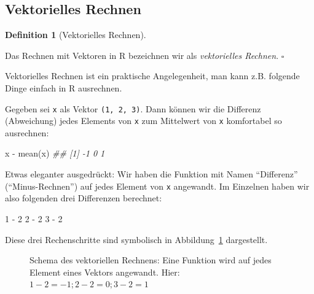 \documentclass[
  letterpaper,
  twoside,
  open=any]{scrbook}
\newenvironment{Shaded}{\begin{snugshade}}{\end{snugshade}}
\newcommand{\DecValTok}[1]{\textcolor[rgb]{0.68,0.00,0.00}{#1}}
\newcommand{\DocumentationTok}[1]{\textcolor[rgb]{0.37,0.37,0.37}{\textit{#1}}}
\newcommand{\FunctionTok}[1]{\textcolor[rgb]{0.28,0.35,0.67}{#1}}
\newcommand{\NormalTok}[1]{\textcolor[rgb]{0.00,0.23,0.31}{#1}}
\newcommand{\SpecialCharTok}[1]{\textcolor[rgb]{0.37,0.37,0.37}{#1}}
\theoremstyle{definition}
\newtheorem{definition}{Definition}[chapter]
\theoremstyle{definition}
\theoremstyle{definition}
\theoremstyle{remark}
\begin{document}
\subsection{Vektorielles Rechnen}\label{sec-veccalc}

\begin{definition}[Vektorielles
Rechnen]\protect\hypertarget{def-veccalc}{}\label{def-veccalc}

Das Rechnen mit Vektoren in R bezeichnen wir als \emph{vektorielles
Rechnen}. \(\square\)

\end{definition}

Vektorielles Rechnen ist ein praktische Angelegenheit, man kann z.B.
folgende Dinge einfach in R ausrechnen.

Gegeben sei \texttt{x} als Vektor \texttt{(1,\ 2,\ 3)}. Dann können wir
die Differenz (Abweichung) jedes Elements von \texttt{x} zum Mittelwert
von \texttt{x} komfortabel so ausrechnen:

\begin{Shaded}
\begin{Highlighting}[]
\NormalTok{x }\SpecialCharTok{{-}} \FunctionTok{mean}\NormalTok{(x)}
\DocumentationTok{\#\# [1] {-}1  0  1}
\end{Highlighting}
\end{Shaded}

Etwas eleganter ausgedrückt: Wir haben die Funktion mit Namen
\enquote{Differenz} (\enquote{Minus-Rechnen}) auf jedes Element von
\texttt{x} angewandt. Im Einzelnen haben wir also folgenden drei
Differenzen berechnet:

\begin{Shaded}
\begin{Highlighting}[]
\DecValTok{1} \SpecialCharTok{{-}} \DecValTok{2}
\DecValTok{2} \SpecialCharTok{{-}} \DecValTok{2}
\DecValTok{3} \SpecialCharTok{{-}} \DecValTok{2}
\end{Highlighting}
\end{Shaded}

Diese drei Rechenschritte sind symbolisch in
Abbildung~\ref{fig-vektoriell} dargestellt.

\begin{figure}


\caption{\label{fig-vektoriell}Schema des vektoriellen Rechnens: Eine
Funktion wird auf jedes Element eines Vektors angewandt. Hier:
\(1-2=-1; 2-2=0; 3-2=1\)}

\end{figure}%
\end{document}
